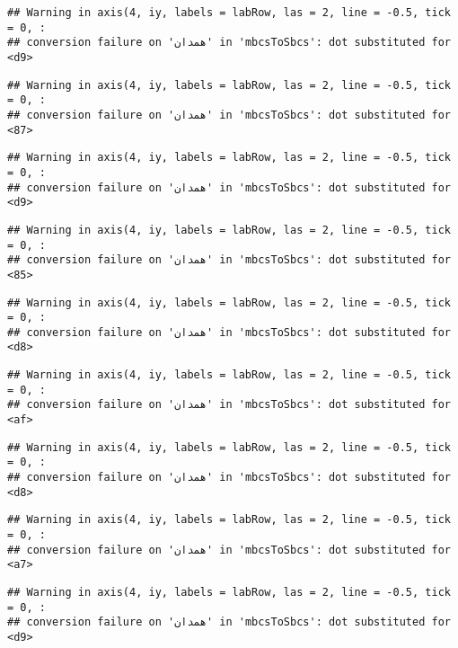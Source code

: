 \documentclass[
]{article}
\begin{document}
\begin{verbatim}
## Warning in axis(4, iy, labels = labRow, las = 2, line = -0.5, tick = 0, :
## conversion failure on 'همدان' in 'mbcsToSbcs': dot substituted for <d9>
\end{verbatim}

\begin{verbatim}
## Warning in axis(4, iy, labels = labRow, las = 2, line = -0.5, tick = 0, :
## conversion failure on 'همدان' in 'mbcsToSbcs': dot substituted for <87>
\end{verbatim}

\begin{verbatim}
## Warning in axis(4, iy, labels = labRow, las = 2, line = -0.5, tick = 0, :
## conversion failure on 'همدان' in 'mbcsToSbcs': dot substituted for <d9>
\end{verbatim}

\begin{verbatim}
## Warning in axis(4, iy, labels = labRow, las = 2, line = -0.5, tick = 0, :
## conversion failure on 'همدان' in 'mbcsToSbcs': dot substituted for <85>
\end{verbatim}

\begin{verbatim}
## Warning in axis(4, iy, labels = labRow, las = 2, line = -0.5, tick = 0, :
## conversion failure on 'همدان' in 'mbcsToSbcs': dot substituted for <d8>
\end{verbatim}

\begin{verbatim}
## Warning in axis(4, iy, labels = labRow, las = 2, line = -0.5, tick = 0, :
## conversion failure on 'همدان' in 'mbcsToSbcs': dot substituted for <af>
\end{verbatim}

\begin{verbatim}
## Warning in axis(4, iy, labels = labRow, las = 2, line = -0.5, tick = 0, :
## conversion failure on 'همدان' in 'mbcsToSbcs': dot substituted for <d8>
\end{verbatim}

\begin{verbatim}
## Warning in axis(4, iy, labels = labRow, las = 2, line = -0.5, tick = 0, :
## conversion failure on 'همدان' in 'mbcsToSbcs': dot substituted for <a7>
\end{verbatim}

\begin{verbatim}
## Warning in axis(4, iy, labels = labRow, las = 2, line = -0.5, tick = 0, :
## conversion failure on 'همدان' in 'mbcsToSbcs': dot substituted for <d9>
\end{verbatim}
\end{document}
